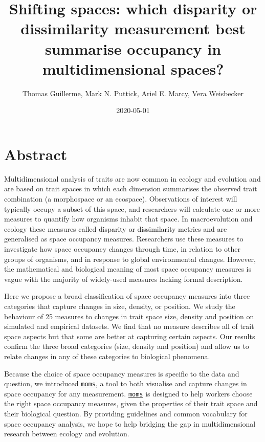 \documentclass[]{article}
\title{Shifting spaces: which disparity or dissimilarity measurement best
summarise occupancy in multidimensional spaces?}
\author{Thomas Guillerme, Mark N. Puttick, Ariel E. Marcy, Vera Weisbecker}
\date{2020-05-01}
\begin{document}
\maketitle

\modulolinenumbers[1] %
\linenumbers

\section{Abstract}\label{abstract}

Multidimensional analysis of traits are now common in ecology and
evolution and are based on trait spaces in which each dimension
summarises the observed trait combination (a morphospace or an
ecospace). Observations of interest will typically occupy a
\textcolor{black}{subset} of this space, and
researchers will calculate one or more measures to quantify how
organisms inhabit that space. In macroevolution and ecology these
measures \textcolor{black}{called disparity or
dissimilarity metrics and are} generalised as space occupancy measures.
Researchers use these measures to investigate how space occupancy
changes through time, in relation to other groups of organisms, and in
response to global environmental changes. However, the mathematical and
biological meaning of most space occupancy measures is vague with the
majority of widely-used measures lacking formal description.

Here we propose a broad classification of space occupancy measures into
three categories that capture changes in size, density, or position. We
study the behaviour of 25 measures to changes in trait space size,
density and position on simulated and empirical datasets. We find that
no measure describes all of trait space aspects but that some are better
at capturing certain aspects. Our results confirm the three broad
categories (size, density and position) and allow us to relate changes
in any of these categories to biological phenomena.

Because the choice of space occupancy measures is specific to the data
and question, we introduced
\href{https://tguillerme.shinyapps.io/moms/}{\texttt{moms}}, a tool to
both visualise and capture changes in space occupancy for any
measurement. \href{https://tguillerme.shinyapps.io/moms/}{\texttt{moms}}
is designed to help workers choose the right space occupancy measures,
given the properties of their trait space and their biological question.
By providing guidelines and common vocabulary for space occupancy
analysis, we hope to help bridging the gap in multidimensional research
between ecology and evolution.
\end{document}
